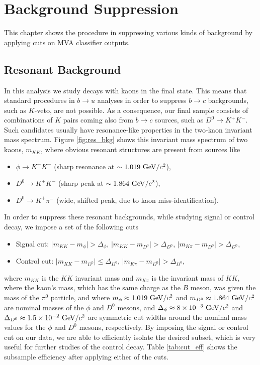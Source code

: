 \chapter{Background Suppression}\label{sec:background-suppression}

This chapter shows the procedure in suppressing various kinds of background by applying cuts on MVA classifier outputs. 

\section{Resonant Background}

In this analysis we study decays with kaons in the final state. This means that standard procedures in $b \to u$ analyses in order to suppress $b \to c$ backgrounds, such as $K$-veto, are not possible. As a consequence, our final sample consists of combinations of $K$ pairs coming also from $b \to c$  sources, such as $D^0 \to K^+ K^-$. Such candidates usually have resonance-like properties in the two-kaon invariant mass spectrum. Figure \ref{fig:res_bkg} shows this invariant mass spectrum of two kaons, $m_{KK}$, where obvious resonant structures are present from sources like
\begin{itemize}
	\item $\phi \to K^+K^-$ (sharp resonance at $\sim1.019\mathrm{~GeV}/c^2$),
	\item $D^0 \to K^+K^-$ (sharp peak at $\sim 1.864\mathrm{~GeV}/c^2$),
	\item $D^0 \to K^+ \pi^-$ (wide, shifted peak, due to kaon miss-identification).
\end{itemize}

In order to suppress these resonant backgrounds, while studying signal or control decay, we impose a set of the following cuts
\begin{itemize}
	\item Signal cut: $\vert m_{KK} - m_{\phi} \vert > \Delta_\phi$, $\vert m_{KK} - m_{D^0} \vert > \Delta_{D^0}$, $\vert m_{K\pi} - m_{D^0} \vert > \Delta_{D^0}$,
	\item Control cut: $\vert m_{KK} - m_{D^0} \vert \leq \Delta_{D^0}$, $\vert m_{K\pi} - m_{D^0} \vert > \Delta_{D^0}$,
\end{itemize}

where $m_{KK}$ is the $KK$ invariant mass and $m_{K\pi}$ is the invariant mass of $KK$, where the kaon's mass, which has the same charge as the $B$ meson, was given the mass of the $\pi^0$ particle, and where $m_\phi \approx 1.019\mathrm{~GeV}/c^2$ and $m_{D^0} \approx 1.864\mathrm{~GeV}/c^2$ are nominal masses of the $\phi$ and $D^0$ mesons, and $\Delta_\phi \approx 8\times 10^{-3}\mathrm{~GeV}/c^2$ and $\Delta_{D^0} \approx 1.5\times 10^{-2}\mathrm{~GeV}/c^2$ are symmetric cut widths around the nominal mass values for the $\phi$ and $D^0$ mesons, respectively. By imposing the signal or control cut on our data, we are able to efficiently isolate the desired subset, which is very useful for further studies of the control decay. Table \ref{tab:cut_eff} shows the subsample efficiency after applying either of the cuts.

